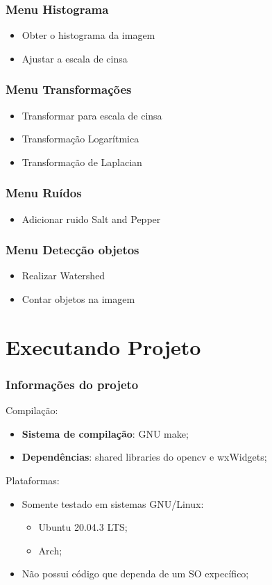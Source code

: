 \documentclass[12pt]{beamer}
\begin{document}
\begin{frame}
    \frametitle{Menu Histograma}
    \begin{itemize}
        \item Obter o histograma da imagem
        \item Ajustar a escala de cinsa
    \end{itemize}
\end{frame}

\begin{frame}
    \frametitle{Menu Transformações}
    \begin{itemize}
        \item Transformar para escala de cinsa
        \item Transformação Logarítmica
        \item Transformação de Laplacian
    \end{itemize}
\end{frame}

\begin{frame}
    \frametitle{Menu Ruídos}
    \begin{itemize}
        \item Adicionar ruido Salt and Pepper
    \end{itemize}
\end{frame}

\begin{frame}
    \frametitle{Menu Detecção objetos}
    \begin{itemize}
        \item Realizar Watershed
        \item Contar objetos na imagem
    \end{itemize}
\end{frame}

\section{Executando Projeto}
\begin{frame}
    \frametitle{Informações do projeto}
    {\large Compilação}:
    \begin{itemize}
        \item \textbf{Sistema de compilação}: GNU make;
        \item \textbf{Dependências}: shared libraries do opencv e wxWidgets;
    \end{itemize}
    {\large Plataformas}:
    \begin{itemize}
        \item Somente testado em sistemas GNU/Linux:
        \begin{itemize}
            \item Ubuntu 20.04.3 LTS;
            \item Arch;
        \end{itemize}
        \item Não possui código que dependa de um SO expecífico;
    \end{itemize}
\end{frame}
\end{document}
